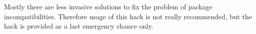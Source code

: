 Mostly there are less invasive solutions to fix the problem of package
incompatibilities. Therefore usage of this hack is not really recommended, but
the hack is provided as a last emergency chance only.%
\EndIndexGroup

\endinput

